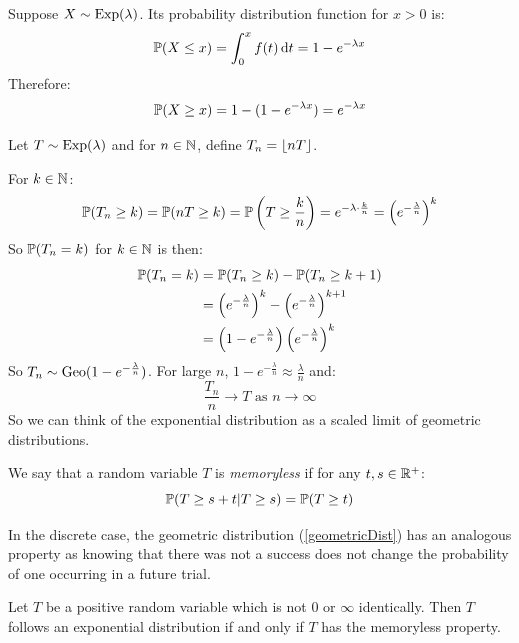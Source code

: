 \documentclass[../main.tex]{subfiles}
\begin{document}
Suppose $X \sim \Exponential(\lambda)$.
Its probability distribution function for $x > 0$ is:
\[
  \P(X \leq x) = \int_{0}^{x} f(t) \d{t} = 1 - e^{-\lambda x}
\]
Therefore:
\[
  \P(X \geq x) = 1 - (1 - e^{-\lambda x}) = e^{-\lambda x}
\]
\begin{example}
  Let $T \sim \Exponential(\lambda)$ and for $n \in \N$, define $T_n = \floor{nT}$.

  For $k \in \N$:
  \[
    \P(T_n \geq k) = \P(nT \geq k) = \P\left(T \geq \frac{k}{n}\right) = e^{-\lambda \cdot \frac{k}{n}} = \left(e^{-\frac{\lambda}{n}}\right)^{k}
  \]
  So $\P(T_n = k)$ for $k \in \N$ is then:
  \begin{align*}
    \P(T_n = k) &= \P(T_n \geq k) - \P(T_n \geq k + 1) \\
                &= \left(e^{-\frac{\lambda}{n}}\right)^{k} - \left(e^{-\frac{\lambda}{n}}\right)^{k + 1} \\
                &= \left(1 - e^{-\frac{\lambda}{n}}\right)\left(e^{-\frac{\lambda}{n}}\right)^{k}
  \end{align*}
  So $T_n \sim \geometric(1 - e^{-\frac{\lambda}{n}})$.
  For large $n$, $1 - e^{-\frac{\lambda}{n}} \approx \frac{\lambda}{n}$ and:
  \[
    \frac{T_n}{n} \to T \text{ as $n \to \infty$}
  \]
  So we can think of the exponential distribution as a scaled limit of geometric distributions.
\end{example}
\begin{definition}
  We say that a random variable $T$ is \textit{memoryless} if for any $t, s \in \R^{+}$:
  \[
    \P(T \geq s + t \vert T \geq s) = \P(T \geq t)
  \]
\end{definition}
\begin{remark}
  In the discrete case, the geometric distribution (\cref{geometricDist}) has an analogous property as knowing that there was not a success does not change the probability of one occurring in a future trial.
\end{remark}
\begin{theorem}
  Let $T$ be a positive random variable which is not 0 or $\infty$ identically.
  Then $T$ follows an exponential distribution if and only if $T$ has the memoryless property.
  \label{expMemoryless}
\end{theorem}
\end{document}
